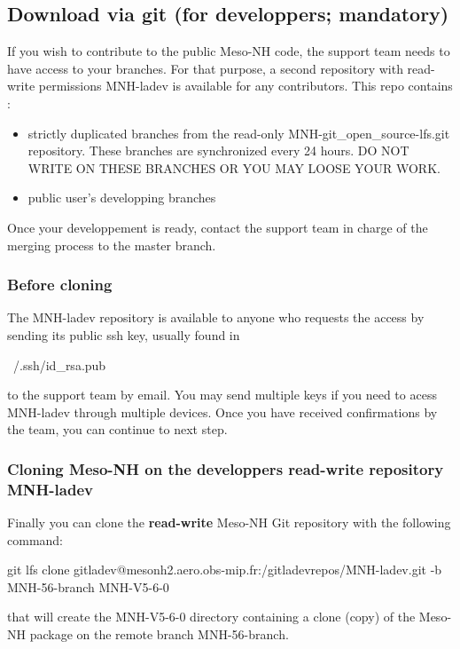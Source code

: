 \subsection{Download via git (for developpers; mandatory)}
\label{sec:dev_sec}
If you wish to contribute to the public Meso-NH code, the support team needs to have access to your branches. For that purpose, a second repository with read-write permissions MNH-ladev is available for any contributors. This repo contains :
\begin{itemize}
    \item strictly duplicated branches from the read-only MNH-git\_open\_source-lfs.git repository. These branches are synchronized every 24 hours. DO NOT WRITE ON THESE BRANCHES OR YOU MAY LOOSE YOUR WORK.
    \item public user's developping branches
\end{itemize}

Once your developpement is ready, contact the support team in charge of the merging process to the master branch.
\subsubsection{Before cloning}
The MNH-ladev repository is available to anyone who requests the access by sending its public ssh key, usually found in 
\begin{bashcode}
    ~/.ssh/id_rsa.pub
\end{bashcode}
to the support team by email. You may send multiple keys if you need to acess MNH-ladev through multiple devices.
Once you have received confirmations by the team, you can continue to next step.

\subsubsection{Cloning Meso-NH on the developpers read-write repository MNH-ladev}
Finally you can clone the \textbf{read-write} Meso-NH Git repository with the following command:
\begin{bashcode}
git lfs clone gitladev@mesonh2.aero.obs-mip.fr:/gitladevrepos/MNH-ladev.git -b MNH-56-branch MNH-V5-6-0
\end{bashcode}

that will create the MNH-V5-6-0 directory containing a clone (copy) of the Meso-NH package on the remote branch MNH-56-branch.

